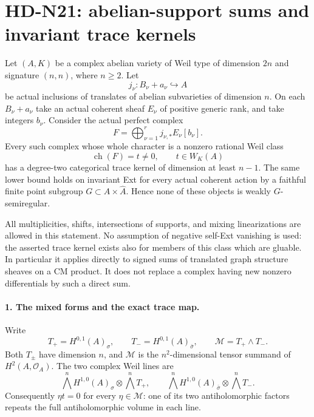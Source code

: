 \section{HD-N21: abelian-support sums and invariant trace kernels}
\label{sec:abelian-support-weil-obstruction}

Let $(A,K)$ be a complex abelian variety of Weil type of dimension
$2n$ and signature $(n,n)$, where $n\ge2$. Let
\[
 j_\nu:B_\nu+a_\nu\hookrightarrow A
\]
be actual inclusions of translates of abelian subvarieties of
dimension $n$. On each $B_\nu+a_\nu$ take an actual coherent
sheaf $E_\nu$ of positive generic rank, and take integers $b_\nu$.
Consider the actual perfect complex
\[
          F=\bigoplus_{\nu=1}^r j_{\nu,*}E_\nu[b_\nu].
                                                               \tag{N21.1}
\]
Every such complex whose whole character is a nonzero rational
Weil class
\[
                   \operatorname{ch}(F)=t\ne0,\qquad
                             t\in W_K(A)                      \tag{N21.2}
\]
has a degree-two categorical trace kernel of dimension at least
$n-1$. The same lower bound holds on invariant Ext for every
actual coherent action by a faithful finite point subgroup
$G\subset A\times\widehat A$. Hence none of these objects is
weakly $G$-semiregular.

All multiplicities, shifts, intersections of supports, and mixing
linearizations are allowed in this statement. No assumption of
negative self-Ext vanishing is used: the asserted trace kernel
exists also for members of this class which are gluable.
In particular it applies directly to signed sums of translated
graph structure sheaves on a CM product. It does not replace a
complex having new nonzero differentials by such a direct sum.

\paragraph{1. The mixed forms and the exact trace map.}
Write
\[
 T_+=H^{0,1}(A)_\sigma,\qquad
 T_-=H^{0,1}(A)_{\bar\sigma},\qquad
                         \mathcal M=T_+\wedge T_- .
                                                               \tag{N21.3}
\]
Both $T_\pm$ have dimension $n$, and $\mathcal M$ is the
$n^2$-dimensional tensor summand of $H^2(A,\mathcal O_A)$.
The two complex Weil lines are
\[
 \bigwedge^nH^{1,0}(A)_\sigma\otimes\bigwedge^nT_+,\qquad
 \bigwedge^nH^{1,0}(A)_{\bar\sigma}\otimes\bigwedge^nT_-.
                                                               \tag{N21.4}
\]
Consequently $\eta t=0$ for every $\eta\in\mathcal M$:
one of its two antiholomorphic factors repeats the full
antiholomorphic volume in each line.

